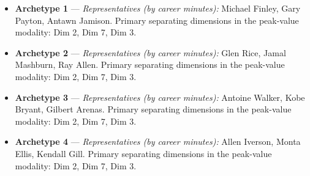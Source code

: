 \begin{itemize}
\item \textbf{Archetype 1} --- \emph{Representatives (by career minutes):} Michael Finley, Gary Payton, Antawn Jamison. Primary separating dimensions in the peak-value modality: Dim 2, Dim 7, Dim 3.
\item \textbf{Archetype 2} --- \emph{Representatives (by career minutes):} Glen Rice, Jamal Mashburn, Ray Allen. Primary separating dimensions in the peak-value modality: Dim 2, Dim 7, Dim 3.
\item \textbf{Archetype 3} --- \emph{Representatives (by career minutes):} Antoine Walker, Kobe Bryant, Gilbert Arenas. Primary separating dimensions in the peak-value modality: Dim 2, Dim 7, Dim 3.
\item \textbf{Archetype 4} --- \emph{Representatives (by career minutes):} Allen Iverson, Monta Ellis, Kendall Gill. Primary separating dimensions in the peak-value modality: Dim 2, Dim 7, Dim 3.
\end{itemize}
